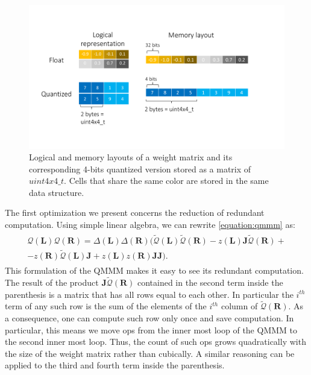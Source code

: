 \begin{figure}
\centering
  \includegraphics[scale=0.3]{figures/uint4x4_t.pdf}
  \caption{\label{fig:uint4x4_t}Logical and memory layouts of a weight matrix and its corresponding 4-bits quantized version stored as a matrix of $uint4x4\_t$. Cells that share the same color are stored in the same data structure. }
\end{figure}


The first optimization we present concerns the reduction of redundant computation. Using simple linear algebra, we can rewrite \cref{equation:qmmm} as:
\begin{align}\label{equation:qmmm_smart}
\begin{split}
\mathcal{Q}(\mathbf{L}) \mathcal{Q}(\mathbf{R}) = \Delta(\mathbf{L}) \Delta(\mathbf{R}) ( \tilde{\mathcal{Q}}(\mathbf{L}) \tilde{\mathcal{Q}}(\mathbf{R}) - z(\mathbf{L}) \mathbf{J} \tilde{\mathcal{Q}}(\mathbf{R}) + \\
- z(\mathbf{R}) \tilde{\mathcal{Q}}(\mathbf{L}) \mathbf{J} +  z(\mathbf{L}) z(\mathbf{R}) \mathbf{J} \mathbf{J} ).
\end{split}
\end{align}
This formulation of the QMMM makes it easy to see its redundant computation. The result of the product $\mathbf{J} \tilde{\mathcal{Q}}(\mathbf{R})$ contained in the second term inside the parenthesis is a matrix that has all rows equal to each other. In particular the $i^{th}$ term of any such row is the sum of the elements of the $i^{th}$ column of  $\tilde{\mathcal{Q}}(\mathbf{R})$. As a consequence, one can compute such row only once and save computation. In particular, this means we move ops from the inner most loop of the QMMM to the second  inner most loop. Thus, the count of such ops grows quadratically with the size of the weight matrix rather than cubically. A similar reasoning can be applied to the third and fourth term inside the parenthesis.

